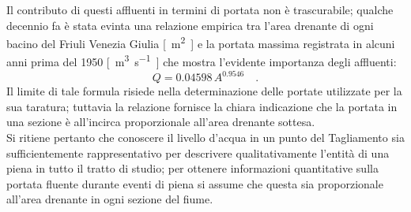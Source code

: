 %
Il contributo di questi affluenti in termini di portata non è trascurabile; qualche decennio fa è stata evinta una relazione empirica tra l'area drenante di ogni bacino del Friuli Venezia Giulia \si{[\m\tothe{2}]} e la portata massima registrata in alcuni anni prima del 1950 \si{[\m\tothe{3}\per\s]}  che mostra l'evidente importanza degli affluenti:
%
\begin{equation}
	\label{eq:area-portata-mosetti}
	Q = 0.04598 \, A^{0.9546}	\quad	.
\end{equation}
%
Il limite di tale formula risiede nella determinazione delle portate utilizzate per la sua taratura; tuttavia la relazione fornisce la chiara indicazione che la portata in una sezione è all'incirca proporzionale all'area drenante sottesa.
\\
Si ritiene pertanto che conoscere il livello d'acqua in un punto del Tagliamento sia sufficientemente rappresentativo per descrivere qualitativamente l'entità di una piena in tutto il tratto di studio; per ottenere informazioni quantitative sulla portata fluente durante eventi di piena si assume che questa sia proporzionale all'area drenante in ogni sezione del fiume.

